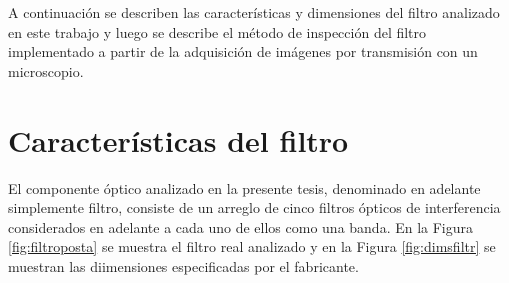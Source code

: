  A continuación se describen las características y dimensiones del filtro analizado en este trabajo y luego se describe el método de inspección del filtro implementado a partir de la adquisición de imágenes por transmisión con un microscopio.

\singlespacing
\section{Características del filtro}
\label{sec:carfilt}

\hspace{0.5cm}El componente óptico analizado en la presente tesis, denominado en adelante simplemente filtro, consiste de un arreglo de cinco filtros ópticos de interferencia  considerados en adelante a cada uno de ellos como una banda. En la Figura \ref{fig:filtroposta} se muestra el filtro real analizado y en la Figura \ref{fig:dimsfiltr} se muestran las diimensiones especificadas por el fabricante.
